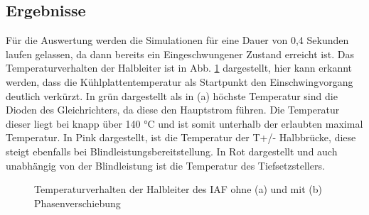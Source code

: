 \subsection{Ergebnisse}
Für die Auswertung werden die Simulationen für eine Dauer von 0,4 Sekunden laufen gelassen, da dann bereits ein Eingeschwungener Zustand erreicht ist. Das Temperaturverhalten der Halbleiter ist in Abb. \ref{fig:iaftemp} dargestellt, hier kann erkannt werden, dass die Kühlplattentemperatur als Startpunkt den Einschwingvorgang deutlich verkürzt. In grün dargestellt als in (a) höchste Temperatur sind die Dioden des Gleichrichters, da diese den Hauptstrom führen. Die Temperatur dieser liegt bei knapp über 140 °C und ist somit unterhalb der erlaubten maximal Temperatur. In Pink dargestellt, ist die Temperatur der T+/- Halbbrücke, diese steigt ebenfalls bei Blindleistungsbereitstellung. In Rot dargestellt und auch unabhängig von der Blindleistung ist die Temperatur des Tiefsetzstellers.  
\begin{figure}
	\centering
	\qquad
	\caption{Temperaturverhalten der Halbleiter des IAF ohne (a) und mit (b) Phasenverschiebung}
	\label{fig:iaftemp}
\end{figure}


